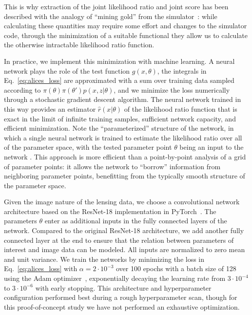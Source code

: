 \documentclass[twocolumn]{aastex62}
\begin{document}
This is why extraction of the joint likelihood ratio and joint score has been described with the analogy of ``mining gold'' from the simulator~\citep{1805.12244}: while calculating these quantities may require some effort and changes to the simulator code, through the minimization of a suitable functional they allow us to calculate the otherwise intractable likelihood ratio function.

In practice, we implement this minimization with machine learning. A neural network plays the role of the test function $g(x, \theta)$, the integrals in Eq.~\eqref{eq:alices_loss} are approximated with a sum over training data sampled according to $\pi(\theta) \pi(\theta') p(x,z|\theta)$, and we minimize the loss numerically through a stochastic gradient descent algorithm. The neural network trained in this way provides an estimator $\hat{r}(x|\theta)$ of the likelihood ratio function that is exact in the limit of infinite training samples, sufficient network capacity, and efficient minimization. Note the ``parameterized'' structure of the network, in which a single neural network is trained to estimate the likelihood ratio over all of the parameter space, with the tested parameter point $\theta$ being an input to the network \citep{Cranmer:2015bka, Baldi:2016fzo}. This approach is more efficient than a point-by-point analysis of a grid of parameter points: it allows the network to ``borrow'' information from neighboring parameter points, benefitting from the typically smooth structure of the parameter space.

Given the image nature of the lensing data, we choose a convolutional network architecture based on the ResNet-18 \citep{he2016deep} implementation in PyTorch~\citep{paszke2017automatic}. The parameters $\theta$ enter as additional inputs in the fully connected layers of the network. Compared to the original ResNet-18 architecture, we add another fully connected layer at the end to ensure that the relation between parameters of interest and image data can be modeled. All inputs are normalized to zero mean and unit variance. We train the networks by minimizing the loss in Eq.~\eqref{eq:alices_loss} with $\alpha = 2 \cdot 10^{-3}$ over 100 epochs with a batch size of 128 using the Adam optimizer~\citep{2014arXiv1412.6980K}, exponentially decaying the learning rate from $3\cdot 10^{-4}$ to $3 \cdot 10^{-6}$ with early stopping. This architecture and hyperparameter configuration performed best during a rough hyperparameter scan, though for this proof-of-concept study we have not performed an exhaustive optimization.
\end{document}

